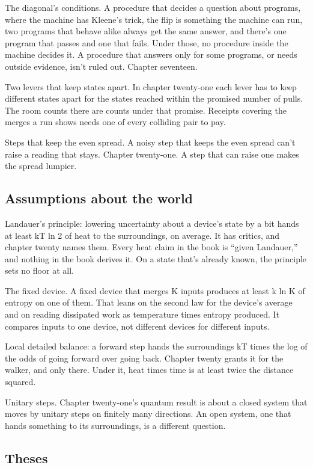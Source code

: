 \documentclass[11pt,twoside]{article}
\theoremstyle{thielethm}
\theoremstyle{thieledef}
\theoremstyle{thieledef}
\theoremstyle{thieledef}
\theoremstyle{thielethm}
\theoremstyle{thieleobs}
\theoremstyle{thielethm}
\begin{document}
The diagonal's conditions. A procedure that decides a question about programs, where the machine has Kleene's trick, the flip is something the machine can run, two programs that behave alike always get the same answer, and there's one program that passes and one that fails. Under those, no procedure inside the machine decides it. A procedure that answers only for some programs, or needs outside evidence, isn't ruled out. Chapter seventeen.

Two levers that keep states apart. In chapter twenty-one each lever has to keep different states apart for the states reached within the promised number of pulls. The room counts there are counts under that promise. Receipts covering the merges a run shows needs one of every colliding pair to pay.

Steps that keep the even spread. A noisy step that keeps the even spread can't raise a reading that stays. Chapter twenty-one. A step that can raise one makes the spread lumpier.

\subsection{Assumptions about the world}

Landauer's principle: lowering uncertainty about a device's state by a bit hands at least kT ln 2 of heat to the surroundings, on average. It has critics, and chapter twenty names them. Every heat claim in the book is ``given Landauer,'' and nothing in the book derives it. On a state that's already known, the principle sets no floor at all.

The fixed device. A fixed device that merges K inputs produces at least k ln K of entropy on one of them. That leans on the second law for the device's average and on reading dissipated work as temperature times entropy produced. It compares inputs to one device, not different devices for different inputs.

Local detailed balance: a forward step hands the surroundings kT times the log of the odds of going forward over going back. Chapter twenty grants it for the walker, and only there. Under it, heat times time is at least twice the distance squared.

Unitary steps. Chapter twenty-one's quantum result is about a closed system that moves by unitary steps on finitely many directions. An open system, one that hands something to its surroundings, is a different question.

\subsection{Theses}
\end{document}
